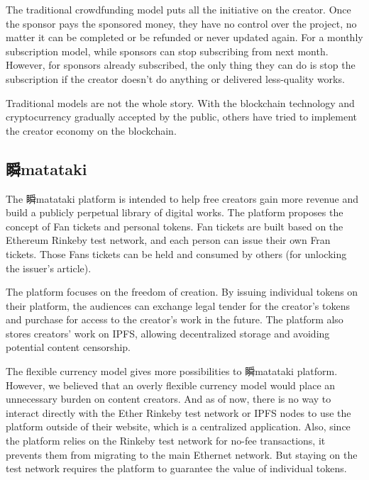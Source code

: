 \documentclass[12pt,a4paper]{article}
\begin{document}
    The traditional crowdfunding model puts all the initiative on the creator.
    Once the sponsor pays the sponsored money, they have no control over the
    project, no matter it can be completed or be refunded or never updated again.
    For a monthly subscription model, while sponsors can stop subscribing from
    next month.
    However, for sponsors already subscribed, the only thing they can do is stop
    the subscription if the creator doesn't do anything or delivered less-quality
    works.

    Traditional models are not the whole story.
    With the blockchain technology and cryptocurrency gradually accepted by the
    public, others have tried to implement the creator economy on the blockchain.

    \subsection{瞬matataki}\label{subsec:blockchain_matataki}

    The 瞬matataki platform is intended to help free creators gain more revenue
    and build a publicly perpetual library of digital works.
    The platform proposes the concept of Fan tickets and personal tokens.
    Fan tickets are built based on the Ethereum Rinkeby test network, and each
    person can issue their own Fran tickets.
    Those Fans tickets can be held and consumed by others (for unlocking the
    issuer's article)\cite{mitataki_fan_ticket}.

    The platform focuses on the freedom of creation.
    By issuing individual tokens on their platform, the audiences can exchange
    legal tender for the creator's tokens and purchase for access to the
    creator's work in the future.
    The platform also stores creators' work on IPFS\cite{ipfs}, allowing
    decentralized storage and avoiding potential content censorship.

    The flexible currency model gives more possibilities to 瞬matataki platform.
    However, we believed that an overly flexible currency model would place an
    unnecessary burden on content creators.
    And as of now, there is no way to interact directly with the Ether Rinkeby
    test network or IPFS nodes to use the platform outside of their website,
    which is a centralized application.
    Also, since the platform relies on the Rinkeby test network for no-fee
    transactions, it prevents them from migrating to the main Ethernet network.
    But staying on the test network requires the platform to guarantee the value
    of individual tokens.
\end{document}
